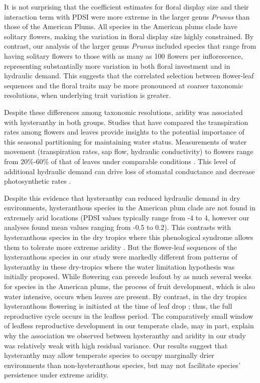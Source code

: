 \documentclass{article}[12pt]
\begin{document}
It is not surprising that the coefficient estimates for floral display size and their interaction term with PDSI were more extreme in the larger genus \emph{Prunus} than those of the American Plums. All species in the American plums clade have solitary flowers, making the variation in floral display size highly constrained. By contrast, our analysis of the larger genus \emph{Prunus} included species that range from having solitary flowers to those with as many as 100 flowers per inflorescence, representing substantially more variation in both floral investment and in hydraulic demand. This suggests that the correlated selection between flower-leaf sequences and the floral traits may be more pronounced at coarser taxonomic resolutions, when underlying trait variation is greater.

Despite these differences among taxonomic resolutions, aridity was associated with hysteranthy in both groups. Studies that have compared the transpiration rates among flowers and leaves provide insights to the potential importance of this seasonal partitioning for maintaining water status. Measurements of water movement (transpiration rates, sap flow, hydraulic conductivity) to flowers range from 20\%-60\% of that of leaves under comparable conditions \citep{Whiley:1988uf,Roddy:2012wn,Liu:2017wg,McMann:2022ww}. This level of additional hydraulic demand can drive loss of stomatal conductance and decrease photosynthetic rates \citep{Galen:1999vr}.
 
Despite this evidence that hysteranthy can reduced hydraulic demand in dry environments, hysteranthous species in the American plum clade are not found in extremely arid locations (PDSI values typically range from -4 to 4, however our analyses found mean values ranging from -0.5 to 0.2). This contrasts with hysteranthous species in the dry tropics where this phenological syndrome allows them to tolerate more extreme aridity \citep{Franklin2016}. But the flower-leaf sequences of the hysteranthous species in our study were markedly different from patterns of hysteranthy in these dry-tropics where the water limitation hypothesis was initially proposed. While flowering can precede leafout by as much several weeks for species in the American plums, the process of fruit development, which is also water intensive, occurs when leaves are present. By contrast, in the dry tropics hysteranthous flowering is initiated at the time of leaf drop \citep{Borchert1983,Franklin2016}; thus, the full reproductive cycle occurs in the leafless period. The comparatively small window of leafless reproductive development in our temperate clade, may in part, explain why the association we observed between hysteranthy and aridity in our study was relatively weak with high residual variance. Our results suggest that hysteranthy may allow temperate species to occupy marginally drier environments than non-hysteranthous species, but may not facilitate species' persistence under extreme aridity. 
\end{document}
